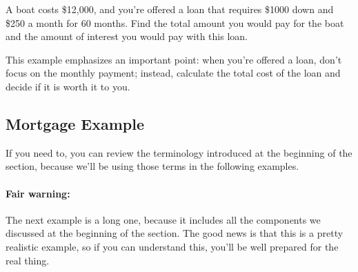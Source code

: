 \begin{try}
A boat costs \$12,000, and you're offered a loan that requires \$1000 down and \$250 a month for 60 months.  Find the total amount you would pay for the boat and the amount of interest you would pay with this loan.
\end{try}

This example emphasizes an important point: when you're offered a loan, don't focus on the monthly payment; instead, calculate the total cost of the loan and decide if it is worth it to you.
\vfill
\pagebreak

\subsection{Mortgage Example}
If you need to, you can review the terminology introduced at the beginning of the section, because we'll be using those terms in the following examples.

\paragraph{Fair warning:} The next example is a long one, because it includes all the components we discussed at the beginning of the section.  The good news is that this is a pretty realistic example, so if you can understand this, you'll be well prepared for the real thing.

